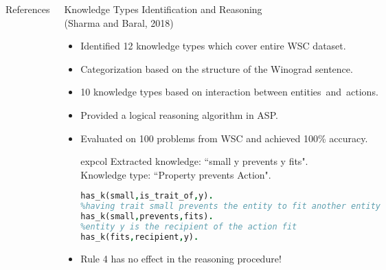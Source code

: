 \documentclass[svgnames, final, 20pt]{beamer} %
\begin{document}
\begin{frame}[fragile]
\begin{columns}[t]
\begin{block}{References}
	
	\tiny{
		
	}
\end{block}



\begin{block}{Knowledge Types Identification and Reasoning\\(Sharma and Baral, 2018)}

\begin{itemize}
	\item Identified 12 {\color{myorange}knowledge types} which cover entire WSC dataset.
	\item Categorization based on the {\color{myorange}structure} of the Winograd sentence.
	\item 10 knowledge types based on interaction between entities~and~actions.  
	\item Provided a {\color{myorange}logical reasoning algorithm} in ASP.
	\item Evaluated on 100 problems from WSC and achieved {\color{myorange}100\%} accuracy.

\vspace{0.3cm}
\begin{beamercolorbox}[rounded=true,sep=0.3cm]{expcol}
Extracted knowledge: ``small y prevents y fits". \\
Knowledge type: ``Property prevents Action".\\
\begin{lstlisting}[language = Prolog, style=SC, numbers=right,
numberstyle=\tiny]
%entity y has a trait small
has_k(small,is_trait_of,y). 		
%having trait small prevents the entity to fit another entity
has_k(small,prevents,fits).	 	
%entity y is the recipient of the action fit
has_k(fits,recipient,y).		
\end{lstlisting}
\end{beamercolorbox}
\item Rule 4 {\color{myorange}has no effect} in the reasoning procedure!


\end{itemize}
\end{block}
\end{columns}
\end{frame}
\end{document}
